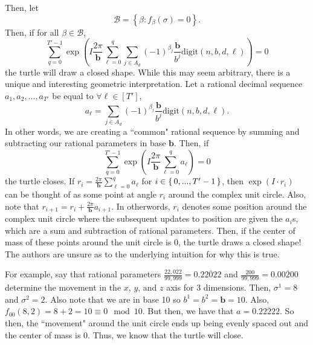 \documentclass[11pt,titlepage]{article}
\newcommand{\rationalPeriodTotal}{{T}'}
\newcommand{\commonBase}{{\pmb{b}}}
\newcommand{\numbToCommon}{\frac{\commonBase}{b^j}}
\newcommand{\commonToAngle}{\frac{2\pi}{\commonBase}}
\begin{document}
Then, let
$$
  \mathcal{B} = \left\{\beta: f_\beta(\sigma) = 0\right\}.
$$
Then, if for all
$\beta \in \mathcal{B}$,
$$
\sum_{q = 0}^{\rationalPeriodTotal - 1}
  \exp\left(
      I 
      \commonToAngle 
      \sum_{\ell = 0}^{q}
      \sum_{j \in A_d}
          \left(-1\right) ^ {\beta_{j}}
          \numbToCommon
          \mathrm{digit}(n, b, d, \ell)
  \right) = 0
$$
the turtle will draw a closed shape. While this may seem arbitrary, there is a unique
and interesting geometric interpretation. 
Let a rational decimal sequence $a_1, a_2, ..., a_{\rationalPeriodTotal}$ be equal to
$
\forall \ell \in [\rationalPeriodTotal]
$,
$$
a_\ell = \sum_{j \in A_d}
\left(-1\right) ^ {\beta_{j}}
\numbToCommon
\mathrm{digit}(n, b, d, \ell).
$$
In other words, we are creating a ``common" rational sequence by summing and subtracting
our rational parameters in base $\commonBase$. Then,
if $$
\sum_{q = 0}^{\rationalPeriodTotal - 1}
\exp\left(
    I 
    \commonToAngle 
    \sum_{\ell = 0}^{q}
      a_\ell
  \right) = 0
$$
the turtle closes.
If $r_i = \commonToAngle \sum_{\ell = 0}^{q} a_\ell$ for 
$i \in \set{0, ..., \rationalPeriodTotal - 1}$, then $\exp(I \cdot r_i)$ can be thought of as some point at angle $r_i$ around the 
complex unit circle. Also, note that $r_{i + 1} = r_i + \commonToAngle a_{i+1}$. In otherwords,
$r_i$ denotes some position around the complex unit circle where the subsequent updates
to position are given the $a_i$s, which are a sum and subtraction of rational parameters. Then, if the center of
mass of these points around the unit circle is $0$, the turtle draws a closed shape!
The authors are unsure as to the underlying intuition for why this is true.


For example, say that rational parameters $\frac{22,022}{99,999} = 0.\overline{22022}$ and
$\frac{200}{99,999} = 0.\overline{00200}$ determine the movement in the $x$, $y$, and $z$ axis for $3$ dimensions.
Then, $\sigma^1 = 8$ and $\sigma^2 = 2$. Also note that we are in base 10 so $b^1 = b^2 = \commonBase = 10$.
Also, $f_{00}(8, 2) = 8 + 2 = 10 \equiv 0 \mod 10$. But then, we have that $a = 0.\overline{22222}$.
So then, the ``movement" around the unit circle ends up being evenly spaced out and the center of mass
is 0. Thus, we know that the turtle will close.
\end{document}
